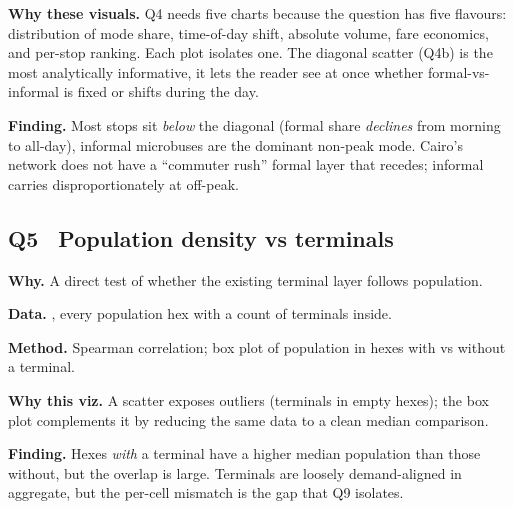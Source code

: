 \textbf{Why these visuals.} Q4 needs five charts because the question
has five flavours: distribution of mode share, time-of-day shift,
absolute volume, fare economics, and per-stop ranking. Each plot
isolates one. The diagonal scatter (Q4b) is the most analytically
informative, it lets the reader see at once whether
formal-vs-informal is fixed or shifts during the day.

\textbf{Finding.} Most stops sit \emph{below} the diagonal (formal
share \emph{declines} from morning to all-day), informal microbuses
are the dominant non-peak mode. Cairo's network does not have a
``commuter rush'' formal layer that recedes; informal carries
disproportionately at off-peak.


\subsection{Q5 \textbullet\ Population density vs terminals}

\textbf{Why.} A direct test of whether the existing terminal layer
follows population.

\textbf{Data.} , every population
hex with a count of terminals inside.

\textbf{Method.} Spearman correlation; box plot of population in hexes
with vs without a terminal.


\textbf{Why this viz.} A scatter exposes outliers (terminals in
empty hexes); the box plot complements it by reducing the same data
to a clean median comparison.

\textbf{Finding.} Hexes \emph{with} a terminal have a higher median
population than those without, but the overlap is large. Terminals
are loosely demand-aligned in aggregate, but the per-cell mismatch is
the gap that Q9 isolates.

